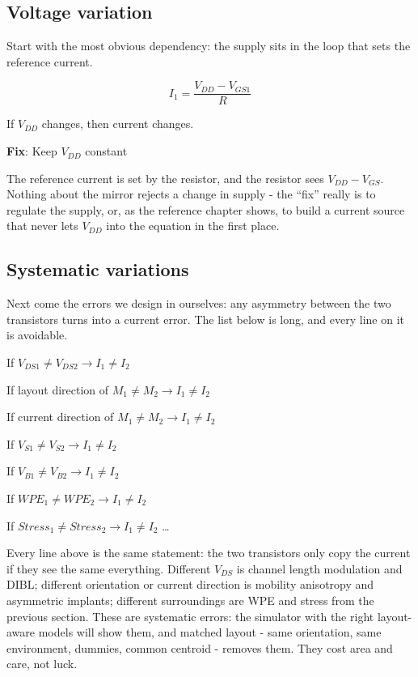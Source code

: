 \subsection{Voltage variation}\label{voltage-variation}

Start with the most obvious dependency: the supply sits in the loop that
sets the reference current.

\[I_1 = \frac{V_{DD} - V_{GS1}}{R}\]

If \(V_{DD}\) changes, then current changes.

\textbf{Fix}: Keep \(V_{DD}\) constant

The reference current is set by the resistor, and the resistor sees
\(V_{DD} - V_{GS}\). Nothing about the mirror rejects a change in supply
- the ``fix'' really is to regulate the supply, or, as the reference
chapter shows, to build a current source that never lets \(V_{DD}\) into
the equation in the first place.

\subsection{Systematic variations}\label{systematic-variations}

Next come the errors we design in ourselves: any asymmetry between the
two transistors turns into a current error. The list below is long, and
every line on it is avoidable.

If \(V_{DS1} \ne V_{DS2} \rightarrow I_1 \ne I_2\)

If layout direction of \(M_1 \ne M_2 \rightarrow I_1 \ne I_2\)

If current direction of \(M_1 \ne M_2 \rightarrow I_1 \ne I_2\)

If \(V_{S1} \ne V_{S2} \rightarrow I_1 \ne I_2\)

If \(V_{B1} \ne V_{B2} \rightarrow I_1 \ne I_2\)

If \(WPE_{1} \ne WPE_{2} \rightarrow I_1 \ne I_2\)

If \(Stress_{1} \ne Stress_{2} \rightarrow I_1 \ne I_2\) \ldots{}

Every line above is the same statement: the two transistors only copy
the current if they see the same everything. Different \(V_{DS}\) is
channel length modulation and DIBL; different orientation or current
direction is mobility anisotropy and asymmetric implants; different
surroundings are WPE and stress from the previous section. These are
systematic errors: the simulator with the right layout-aware models will
show them, and matched layout - same orientation, same environment,
dummies, common centroid - removes them. They cost area and care, not
luck.

